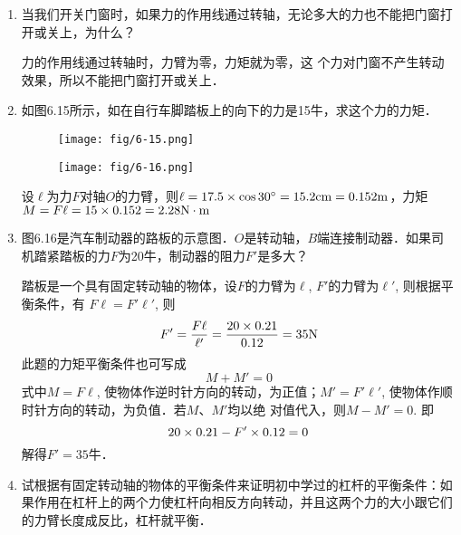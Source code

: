 \begin{enumerate}
    \item 当我们开关门窗时，如果力的作用线通过转轴，无论多大的力也不能把门窗打开或关上，为什么？

  \begin{solution}
        力的作用线通过转轴时，力臂为零，力矩就为零，这
        个力对门窗不产生转动效果，所以不能把门窗打开或关上．
    \end{solution}
  
    \item 如图6.15所示，如在自行车脚踏板上的向下的力是15牛，求这个力的力矩．
    \begin{figure}[htp]\centering
        \begin{minipage}[t]{0.48\textwidth}
        \centering
    \texttt{[image: fig/6-15.png]}
        \caption{}
        \end{minipage}
        \begin{minipage}[t]{0.48\textwidth}
        \centering
    \texttt{[image: fig/6-16.png]}
        \caption{}
        \end{minipage}
        \end{figure}


\begin{solution}
    设$\ell$为力$F$对轴$O$的力臂，则$\ell =17.5\times\cos30^{\circ}=15.2{\rm cm}=0.152{\rm m}$，力矩$M=F\ell=15\times0.152=2.28{\rm N\cdot m}$
\end{solution}

    \item 图6.16是汽车制动器的路板的示意图．$O$是转动轴，$B$端连接制动器．如果司机踏紧踏板的力$F$为20牛，制动器的阻力$F'$是多大？

\begin{solution}
    踏板是一个具有固定转动轴的物体，设$F$的力臂为$\ell$, $F'$的力臂为$\ell'$, 则根据平衡条件，有
    $F\ell=F'\ell'$, 则
\[F'=\frac{F\ell }{\ell'}=\frac{20\times 0.21}{0.12}=35{\rm N}\]
此题的力矩平衡条件也可写成
\[M+M'=0\]
式中$M=F\ell$, 使物体作逆时针方向的转动，为正值；$M'=
F'\ell'$, 使物体作顺时针方向的转动，为负值．若$M$、$M'$均以绝
对值代入，则$M-M'=0$. 即
\[20\times0.21-F'\times0.12=0\]
解得$F'=35$牛．
\end{solution}

    \item 试根据有固定转动轴的物体的平衡条件来证明初中学过的杠杆的平衡条件：如果作用在杠杆上的两个力使杠杆向相反方向转动，并且这两个力的大小跟它们的力臂长度成反比，杠杆就平衡．
    \begin{figure}[htp]
        \centering   
{}
\end{figure}
\end{enumerate}
